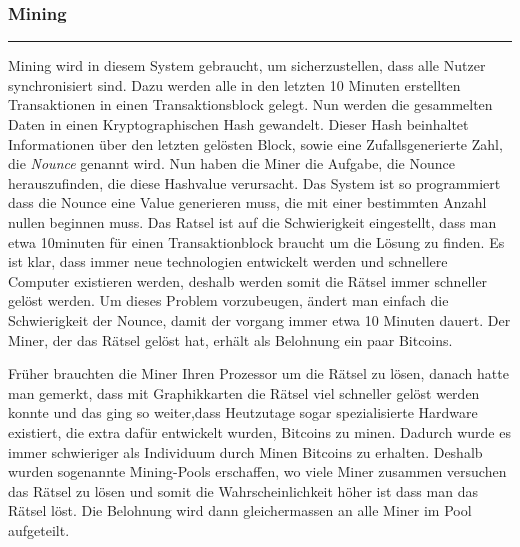 \vspace*{1mm}
\subsubsection*{Mining}
\vspace{-10mm}
\noindent\rule{0.8\textwidth}{0.4pt}

\vspace{5mm}

\noindent
Mining wird in diesem System gebraucht, um sicherzustellen, dass alle Nutzer synchronisiert sind. Dazu werden alle in den letzten 10 Minuten erstellten Transaktionen in einen Transaktionsblock gelegt.
Nun werden die gesammelten Daten in einen Kryptographischen Hash gewandelt. Dieser Hash beinhaltet Informationen über den letzten gelösten Block, sowie eine Zufallsgenerierte Zahl, die
\emph{\dq Nounce \dq} genannt wird. Nun haben die Miner die Aufgabe, die Nounce herauszufinden, die diese Hashvalue verursacht. Das System ist so programmiert dass die Nounce eine Value
generieren muss, die mit einer bestimmten Anzahl nullen beginnen muss. Das Ratsel ist auf die Schwierigkeit eingestellt, dass man etwa 10minuten für einen Transaktionblock braucht um die Lösung
zu finden. Es ist klar, dass immer neue technologien entwickelt werden und schnellere Computer existieren werden, deshalb werden somit die Rätsel immer schneller gelöst werden. Um dieses Problem vorzubeugen,
ändert man einfach die Schwierigkeit der Nounce, damit der vorgang immer etwa 10 Minuten dauert. Der Miner, der das Rätsel gelöst hat, erhält als Belohnung ein paar Bitcoins.

\noindent
Früher brauchten die Miner Ihren Prozessor um die Rätsel zu lösen, danach hatte man gemerkt, dass mit Graphikkarten die Rätsel viel schneller gelöst werden konnte und das ging so weiter,dass
Heutzutage sogar spezialisierte Hardware existiert, die extra dafür entwickelt wurden, Bitcoins zu minen. Dadurch wurde es immer schwieriger als Individuum durch Minen Bitcoins zu erhalten.
Deshalb wurden sogenannte Mining-Pools erschaffen, wo viele Miner zusammen versuchen das Rätsel zu lösen und somit die Wahrscheinlichkeit höher ist dass man das Rätsel löst. Die Belohnung wird dann
gleichermassen an alle Miner im Pool aufgeteilt.




\newpage
